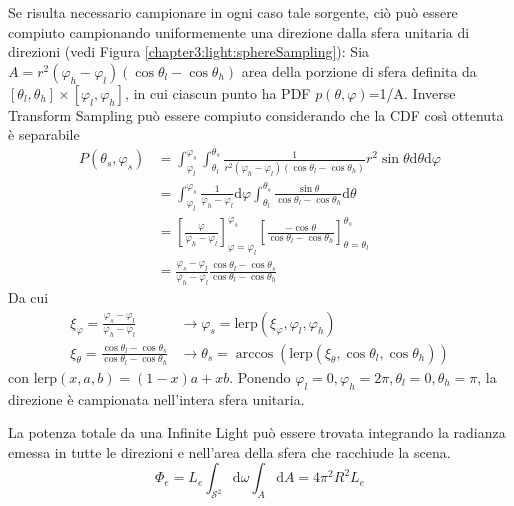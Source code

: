 Se risulta necessario campionare in ogni caso tale sorgente, ci\`o pu\`o essere compiuto campionando uniformemente una direzione dalla sfera unitaria
di direzioni (vedi Figura \ref{chapter3:light:sphereSampling}): Sia 
\mbox{$A=r^2(\varphi_h-\varphi_l)(\cos\theta_l-\cos\theta_h)$} area della porzione di sfera definita da 
\mbox{$[\theta_l,\theta_h]\times[\varphi_l,\varphi_h]$}, in cui ciascun punto ha PDF \mbox{$p(\theta,\varphi)$=1/A}. Inverse Transform Sampling pu\`o
essere compiuto considerando che la CDF cos\`i ottenuta \`e separabile
\begin{align}
	P(\theta_s,\varphi_s)&=\int_{\varphi_l}^{\varphi_s}\int_{\theta_l}^{\theta_s}%
		\frac{1}{r^2(\varphi_h-\varphi_l)(\cos\theta_l-\cos\theta_h)}r^2\sin\theta\mathrm{d}\theta\mathrm{d}\varphi \nonumber \\
	&=\int_{\varphi_l}^{\varphi_s}\frac{1}{\varphi_h-\varphi_l}\mathrm{d}\varphi%
		\int_{\theta_l}^{\theta_s}\frac{\sin\theta}{\cos\theta_l-\cos\theta_h}\mathrm{d}\theta \nonumber \\
	&=\left[\frac{\varphi}{\varphi_h-\varphi_l}\right]_{\varphi=\varphi_l}^{\varphi_s}%
		\left[\frac{-\cos\theta}{\cos\theta_l-\cos\theta_h}\right]_{\theta=\theta_l}^{\theta_s} \nonumber \\
	&=\frac{\varphi_s-\varphi_l}{\varphi_h-\varphi_l}\frac{\cos\theta_l-\cos\theta_s}{\cos\theta_l-\cos\theta_h}
\end{align}
Da cui
\begin{align}
	\xi_\varphi=\frac{\varphi_s-\varphi_l}{\varphi_h-\varphi_l}&\longrightarrow\varphi_s=\mathrm{lerp}(\xi_\varphi,\varphi_l,\varphi_h) \\
	\xi_\theta=\frac{\cos\theta_l-\cos\theta_s}{\cos\theta_l-\cos\theta_h}&\longrightarrow\theta_s=%
		\arccos(\mathrm{lerp}(\xi_\theta,\cos\theta_l,\cos\theta_h))
\end{align}
con $\mathrm{lerp}(x,a,b)=(1-x)a+xb$. Ponendo $\varphi_l=0,\varphi_h=2\pi,\theta_l=0,\theta_h=\pi$, la direzione \`e campionata nell'intera sfera 
unitaria.\par
La potenza totale da una Infinite Light pu\`o essere trovata integrando la radianza emessa in tutte le direzioni e nell'area della sfera che racchiude
la scena.\footnotemark{}
\begin{equation}\label{chapter3:light:infiniteLightPower}
	\Phi_e=L_e\int_{\mathcal{S}^2}\mathrm{d}\hat{\omega}\int_A\mathrm{d}A=4\pi^2R^2L_e
\end{equation}
